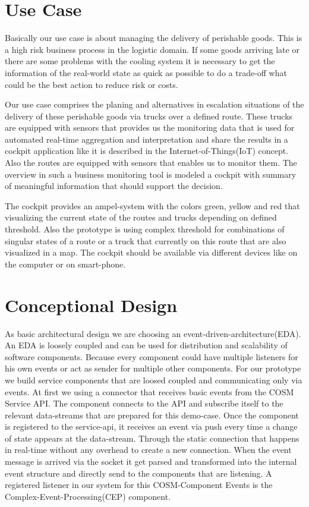 \documentclass{acm_proc_article-sp}
\begin{document}
\section{Use Case}
\label{sec:Use Case}

Basically our use case is about managing the delivery of perishable goods. This is a high risk business process in the logistic domain. If some goods arriving late or there are some problems with the cooling system it is necessary to get the information of the real-world state as quick as possible to do a trade-off what could be the best action to reduce risk or costs.

Our use case comprises the planing and alternatives in escalation situations of the delivery of these perishable goods via trucks over a defined route. These trucks are equipped with sensors that provides us the monitoring data that is used for automated real-time aggregation and interpretation and share the results in a cockpit application like it is described in the Internet-of-Things(IoT) concept. 
Also the routes are equipped with sensors that enables us to monitor them.
The overview in such a business monitoring tool is modeled a cockpit with summary of meaningful information that should support the decision. 

The cockpit provides an ampel-system with the colors green, yellow and red that visualizing the current state of the routes and trucks depending on defined threshold.
Also the prototype is using complex threshold for combinations of singular states of a route or a truck that currently on this route that are also visualized in a map.
The cockpit should be available via different devices like on the computer or on smart-phone.
\section{Conceptional Design}
\label{sec:Conceptional Design}

As basic architectural design we are choosing an event-driven-architecture(EDA).
An EDA is loosely coupled and can be used for distribution and scalability of software components. Because every component could have multiple listeners for his own events or act as sender for multiple other components.
For our prototype we build service components that are loosed coupled and communicating only via events.
At first we using a connector that receives basic events from the COSM Service API.
The component connects to the API and subscribe itself to the relevant data-streams that are prepared for this demo-case.
Once the component is registered to the service-api, it receives an event via push every time a change of state appears at the data-stream. Through the static connection that happens in real-time without any overhead to create a new connection.
When the event message is arrived via the socket it get parsed and transformed into the internal event structure and directly send to the components that are listening.
A registered listener in our system for this COSM-Component Events is the Complex-Event-Processing(CEP) component.
\end{document}
